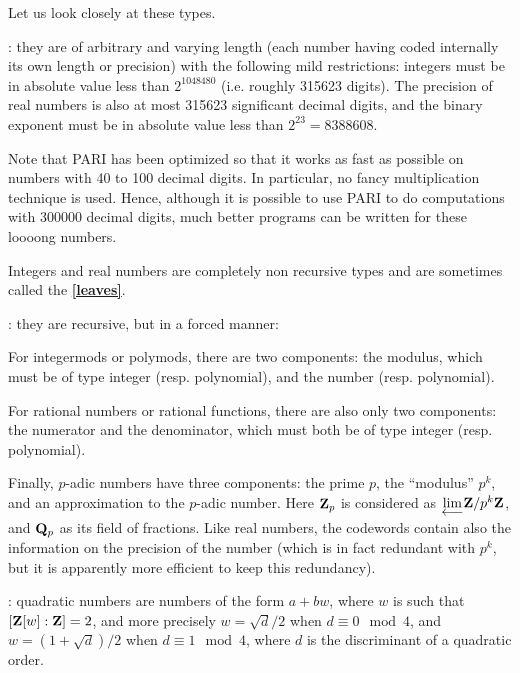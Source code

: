Let us look closely at these types.

:
they are of arbitrary and varying length
(each number having coded
internally its own length or precision) with the following mild restrictions:
integers must be in absolute value less than $2^{1048480}$ (i.e. roughly
315623 digits).
The precision of real numbers is also at most 315623 significant decimal
digits, and the
binary exponent must be in absolute value less than $2^{23}=8388608$.

Note that PARI has been optimized so that it works as fast as possible on
numbers with
40 to 100 decimal digits. In particular, no fancy multiplication technique is
used.
Hence, although it is possible to use PARI to do computations with 300000
decimal digits, much better programs can be written for these loooong numbers.

Integers and real numbers are completely non recursive types and are sometimes
called the {\bf \ref{leaves}}.

:
 they are recursive, but in a forced manner:

For integermods or polymods, there are two components: the modulus, which
must be of type integer (resp. polynomial), and the number (resp. polynomial).

For rational numbers or rational functions, there are also only two
components: the numerator
and the denominator, which must both be of type integer (resp. polynomial).

Finally, $p$-adic numbers have three components: the prime $p$, the
``modulus'' $p^k$,
and an approximation to the $p$-adic number. Here $\Bbb Z_p$ is considered as
$\varprojlim \Bbb Z/p^k\Bbb Z$, and $\Bbb Q_p$ as its field of fractions.
Like real numbers, the codewords contain also the information on the
precision
of the number (which is in fact redundant with $p^k$, but it is apparently more
efficient to keep this redundancy).

: 
quadratic numbers are numbers of the form $a+bw$,
where $w$ is such that $[\Bbb Z[w]:\Bbb Z]=2$, and more precisely $w=\sqrt
d/2$ when
$d\equiv 0 \mod 4$, and $w=(1+\sqrt d)/2$ when $d\equiv 1 \mod 4$, where $d$
is
the discriminant of a quadratic order.

